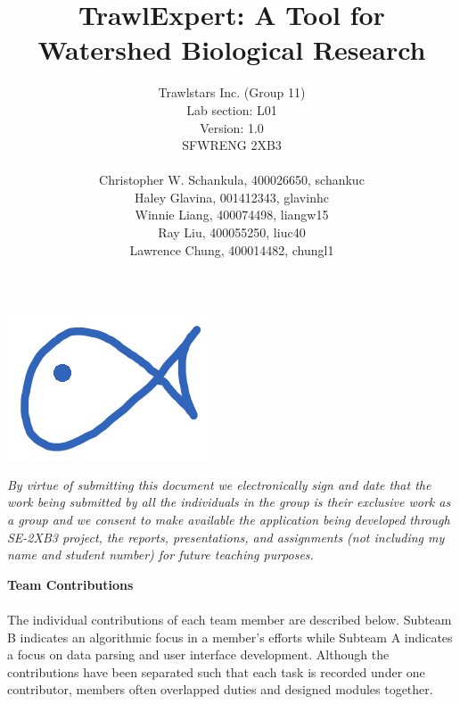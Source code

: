 \documentclass{article}
\begin{document}
\title{\textbf{TrawlExpert: A Tool for Watershed Biological Research}}
\author{Trawlstars Inc. (Group 11) \\ Lab section: L01  \\ Version: 1.0 \\ SFWRENG 2XB3 \\ \\ Christopher W. Schankula, 400026650, schankuc \\ Haley Glavina, 001412343, glavinhc \\ Winnie Liang, 400074498, liangw15 \\ Ray Liu, 400055250, liuc40 \\ Lawrence Chung, 400014482, chungl1\\}


\maketitle

\begin{center}
\includegraphics{logo.png}
\end{center}

\newpage

\begin{versionhistory}
\end{versionhistory} 

\noindent\textit{By virtue of submitting this document we electronically sign and date that the work being submitted by all the individuals in the group is their exclusive work as a group and we consent to make available the application being developed through SE-2XB3 project, the reports, presentations, and assignments (not including my name and student number) for future teaching purposes.}

\newpage

\textbf{\Large{Team Contributions}}\\ \\
The individual contributions of each team member are described below. Subteam B indicates an algorithmic focus in a member's efforts while Subteam A indicates a focus on data parsing and user interface development. Although the contributions have been separated such that each task is recorded under one contributor, members often overlapped duties and designed modules together. \\
\end{document}
